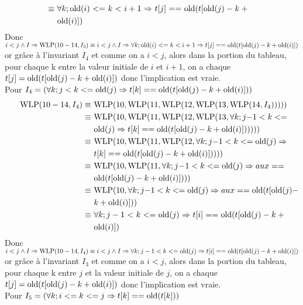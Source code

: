\documentclass[11pt,answers]{exam}
\begin{document}
\begin{questions}
\begin{parts}
\begin{solutionorbox}
\begin{align*}
        \equiv               & ~\breaktowidth{8.2cm}{\forall k; \old(i) <= k < i+1 \Rightarrow t[j] == \old(t[\old(j)-k+\old(i)])}
      \end{align*}
      Donc $i < j \land I \Rightarrow \mathrm{WLP}(10-14,I_3)\\
      \equiv i < j \land I \Rightarrow \forall k; \mathrm{old}(i) <= k < i+1 \Rightarrow t[j] == \mathrm{old}(t[\mathrm{old}(j)-k+\mathrm{old}(i)])$\\
      or grâce à l'invariant $I_4$ et comme on a $i<j$, alors dans la portion du tableau, pour chaque k entre la valeur initiale de $i$ et $i+1$, on a
      chaque $t[j] = \mathrm{old}(t[\mathrm{old}(j)-k+\mathrm{old}(i)])$ donc l'implication est vraie.\\
      Pour $I_4 = (\forall k; j < k <= \mathrm{old}(j) \Rightarrow t[k] == \mathrm{old}(t[\mathrm{old}(j)-k+\mathrm{old}(i)]))$
      \begin{align*}
        \WLP(10-14,I_4) \equiv & ~\breaktowidth{8.2cm}{\WLP(10, \WLP(11, \WLP(12, \WLP(13, \WLP(14, I_4)))))}\\
        \equiv               & ~\breaktowidth{8.2cm}{\WLP(10, \WLP(11, \WLP(12, \WLP(13, \forall k; j-1 < k <= \old(j) \Rightarrow t[k] == \old(t[\old(j)-k+\old(i)])))))}\\
        \equiv               & ~\breaktowidth{8.2cm}{\WLP(10, \WLP(11, \WLP(12, \forall k; j-1 < k <= \old(j) \Rightarrow t[k] == \old(t[\old(j)-k+\old(i)]))))}\\
        \equiv               & ~\breaktowidth{8.2cm}{\WLP(10, \WLP(11, \forall k; j-1 < k <= \old(j) \Rightarrow aux == \old(t[\old(j)-k+\old(i)])))}\\
        \equiv               & ~\breaktowidth{8.2cm}{\WLP(10, \forall k; j-1 < k <= \old(j) \Rightarrow aux == \old(t[\old(j)-k+\old(i)]))}\\
        \equiv               & ~\breaktowidth{8.2cm}{\forall k; j-1 < k <= \old(j) \Rightarrow t[i] == \old(t[\old(j)-k+\old(i)])}
      \end{align*}
      Donc $i < j \land I \Rightarrow \mathrm{WLP}(10-14,I_4)\\
      \equiv i < j \land I \Rightarrow \forall k; j-1 < k <= \mathrm{old}(j) \Rightarrow t[i] == \mathrm{old}(t[\mathrm{old}(j)-k+\mathrm{old}(i)])$\\
      or grâce à l'invariant $I_3$ et comme on a $i<j$, alors dans la portion du tableau, pour chaque k entre $j$ et la valeur initiale de $j$, on a
      chaque $t[j] = \mathrm{old}(t[\mathrm{old}(j)-k+\mathrm{old}(i)])$ donc l'implication est vraie.\\
      Pour $I_5 = (\forall k; i <= k <= j \Rightarrow t[k] == \mathrm{old}(t[k]))$

\end{solutionorbox}
\end{parts}
\end{questions}
\end{document}
